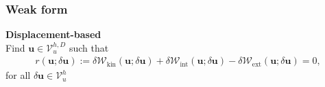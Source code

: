 \documentclass[a4paper,12pt]{report}
\begin{document}
\subsubsection{Weak form}

\textbf{Displacement-based}\\
Find $\boldsymbol{u}\in\boldsymbol{\mathcal{V}}_{u}^{h,D}$ such that
\begin{equation}
\label{equation-solid-weak-form}
\begin{aligned}
r(\boldsymbol{u};\delta\boldsymbol{u}) := \delta \mathcal{W}_{\mathrm{kin}}(\boldsymbol{u};\delta\boldsymbol{u}) + \delta \mathcal{W}_{\mathrm{int}}(\boldsymbol{u};\delta\boldsymbol{u}) - \delta \mathcal{W}_{\mathrm{ext}}(\boldsymbol{u};\delta\boldsymbol{u}) = 0, \end{aligned}
\end{equation}
for all $\delta\boldsymbol{u}\in\boldsymbol{\mathcal{V}}_{u}^{h}$\\
\end{document}
